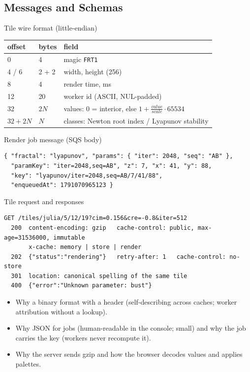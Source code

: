 \documentclass[a4paper,12pt]{article}
\begin{document}
\subsection{Messages and Schemas}

\begin{schemabox}{Tile wire format (little-endian)}
\small
\begin{tabularx}{\linewidth}{p{1.6cm} p{1.4cm} X}
offset & bytes & field \\
\midrule
0 & 4 & magic \texttt{FRT1} \\
4 / 6 & 2 + 2 & width, height (256) \\
8 & 4 & render time, ms \\
12 & 20 & worker id (ASCII, NUL-padded) \\
32 & $2N$ & values: 0 = interior, else $1 + \frac{value}{scale}\cdot 65534$ \\
$32+2N$ & $N$ & classes: Newton root index / Lyapunov stability \\
\end{tabularx}
\end{schemabox}

\begin{schemabox}{Render job message (SQS body)}
\footnotesize
\begin{verbatim}
{ "fractal": "lyapunov", "params": { "iter": 2048, "seq": "AB" },
  "paramKey": "iter=2048,seq=AB", "z": 7, "x": 41, "y": 88,
  "key": "lyapunov/iter=2048,seq=AB/7/41/88",
  "enqueuedAt": 1791070965123 }
\end{verbatim}
\end{schemabox}

\begin{schemabox}{Tile request and responses}
\footnotesize
\begin{verbatim}
GET /tiles/julia/5/12/19?cim=0.156&cre=-0.8&iter=512
  200  content-encoding: gzip   cache-control: public, max-age=31536000, immutable
       x-cache: memory | store | render
  202  {"status":"rendering"}   retry-after: 1   cache-control: no-store
  301  location: canonical spelling of the same tile
  400  {"error":"Unknown parameter: bust"}
\end{verbatim}
\end{schemabox}

\begin{yourwriting}
\begin{itemize}
    \item Why a binary format with a header (self-describing across caches; worker attribution without a lookup).
    \item Why JSON for jobs (human-readable in the console; small) and why the job carries the key (workers never recompute it).
    \item Why the server sends gzip and how the browser decodes values and applies palettes.
\end{itemize}
\end{yourwriting}
\end{document}

